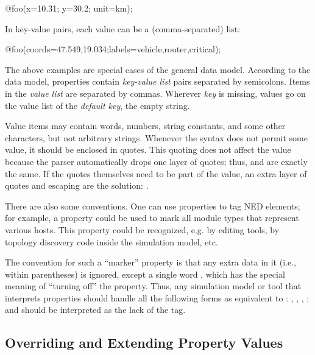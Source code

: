 \begin{ned}
@foo(x=10.31; y=30.2; unit=km);
\end{ned}

In key-value pairs, each value can be a (comma-separated) list:

\begin{ned}
@foo(coords=47.549,19.034;labels=vehicle,router,critical);
\end{ned}

The above examples are special cases of the general data model. According to the
data model, properties contain \textit{key-value list} pairs separated by
semicolons. Items in the \textit{value list} are separated by commas. Wherever
\textit{key} is missing, values go on the value list of the \textit{default
key}, the empty string.

Value items may contain words, numbers, string constants, and some other
characters, but not arbitrary strings. Whenever the syntax does not permit some
value, it should be enclosed in quotes. This quoting does not affect the value
because the parser automatically drops one layer of quotes; thus,
 and  are exactly the same. If the quotes
themselves need to be part of the value, an extra layer of quotes and escaping
are the solution: .

There are also some conventions. One can use properties to tag NED elements; for
example, a  property could be used to mark all module types that
represent various hosts. This property could be recognized, e.g. by editing
tools, by topology discovery code inside the simulation model, etc.

The convention for such a ``marker'' property is that any extra data in it (i.e.,
within parentheses) is ignored, except a single word , which has the
special meaning of ``turning off'' the property. Thus, any simulation model or
tool that interprets properties should handle all the following forms as
equivalent to : , ,
, ; and 
should be interpreted as the lack of the  tag.


\subsection{Overriding and Extending Property Values}
\label{sec:ned-lang:overriding-and-extending-property-values}

